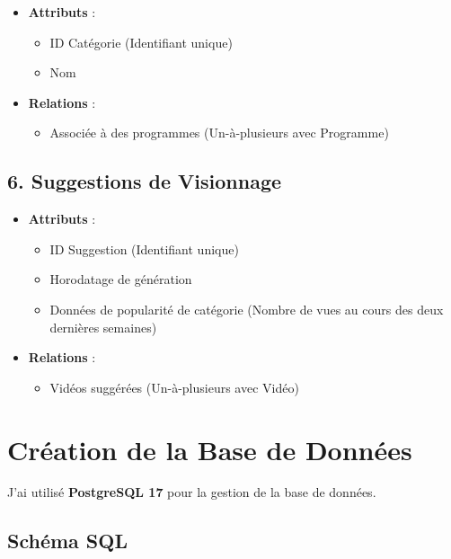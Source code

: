 \documentclass[a4paper, 12pt]{article}
\begin{document}
\begin{itemize}
    \item \textbf{Attributs} :
    \begin{itemize}
        \item ID Catégorie (Identifiant unique)
        \item Nom
    \end{itemize}
    \item \textbf{Relations} :
    \begin{itemize}
        \item Associée à des programmes (Un-à-plusieurs avec Programme)
    \end{itemize}
\end{itemize}

\subsection*{6. Suggestions de Visionnage}

\begin{itemize}
    \item \textbf{Attributs} :
    \begin{itemize}
        \item ID Suggestion (Identifiant unique)
        \item Horodatage de génération
        \item Données de popularité de catégorie (Nombre de vues au cours des deux dernières semaines)
    \end{itemize}
    \item \textbf{Relations} :
    \begin{itemize}
        \item Vidéos suggérées (Un-à-plusieurs avec Vidéo)
    \end{itemize}
\end{itemize}

\section*{Création de la Base de Données}

J'ai utilisé \textbf{PostgreSQL 17} pour la gestion de la base de données.

\subsection*{Schéma SQL}
\end{document}

